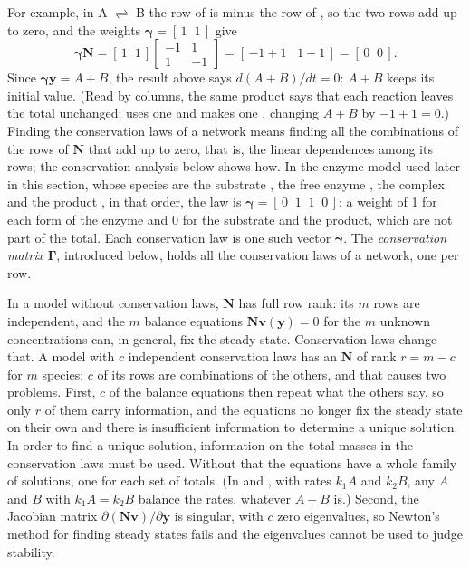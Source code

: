 \documentclass[11pt,a4paper,openany]{report}
\begin{document}
{{For example, in A $\rightleftharpoons$ B the row of  is minus the
row of , so the two rows add up to zero, and the weights
$\boldsymbol{\gamma} = [\,1 \;\; 1\,]$ give
\[
  \boldsymbol{\gamma} \mathbf{N}
  = [\,1 \;\; 1\,] \begin{bmatrix} -1 & 1 \\ 1 & -1 \end{bmatrix}
  = [\,{-1} + 1 \;\;\; 1 - 1\,] = [\,0 \;\; 0\,] .
\]
Since $\boldsymbol{\gamma} \mathbf{y} = A + B$, the result above says
$d(A + B)/dt = 0$: $A + B$ keeps its initial value. (Read by columns, the
same product says that each reaction leaves the total unchanged: 
uses one  and makes one , changing $A + B$ by $-1 + 1 = 0$.)
Finding the conservation laws of a network means finding all the
combinations of the rows of $\mathbf{N}$ that add up to zero, that is, the
linear dependences among its rows; the conservation analysis below shows
how.
In the enzyme model used later in this section,
whose species are the substrate , the free enzyme , the
complex  and the product , in that order, the law
 is $\boldsymbol{\gamma} = [\,0 \;\; 1 \;\; 1 \;\; 0\,]$: a
weight of 1 for each form of the enzyme and 0 for the substrate and the
product, which are not part of the total. Each conservation law is one
such vector $\boldsymbol{\gamma}$. The \emph{conservation matrix} $\mathbf{\Gamma}$, introduced
below, holds all the conservation laws of a network, one per row.

In a model without conservation laws, $\mathbf{N}$ has full row rank: its
$m$ rows are independent, and the $m$ balance equations
$\mathbf{N} \mathbf{v}(\mathbf{y}) = 0$ for the $m$ unknown concentrations
can, in general, fix the steady state. Conservation laws change that. A
model with $c$ independent conservation laws has an $\mathbf{N}$ of rank
$r = m - c$ for $m$ species: $c$ of its rows are combinations of the
others, and that causes two problems. First, $c$ of the balance equations
then repeat what the others say, so only $r$ of them carry information, and
the equations no longer fix the steady state on their own and there is insufficient information to determine a unique solution. In order
to find a unique solution, information on the total masses in the conservation laws must be used. Without that the equations have a whole family of
solutions, one for each set of totals. (In
 and , with rates $k_1 A$ and $k_2 B$, any $A$
and $B$ with $k_1 A = k_2 B$ balance the rates, whatever $A + B$ is.) Second, the Jacobian matrix $\partial (\mathbf{N} \mathbf{v}) / \partial \mathbf{y}$ is singular,
with $c$ zero eigenvalues, so Newton's method for finding steady states fails and the eigenvalues
cannot be used to judge stability.

}}
\end{document}
